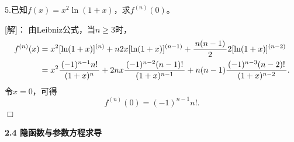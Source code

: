 \bigskip

5.已知$f(x)=x^2\ln(1+x)$，求$f^{(n)}(0)$。

[解]：
由Leibniz公式，当$n\geq3$时，
\begin{align*}
	f^{(n)}(x)&=x^2[\ln(1+x)]^{(n)}+n2x[\ln(1+x)]^{(n-1)}
	+\displaystyle\frac{\,{n(n-1)}\,}{\,{2}\,}2[\ln(1+x)]^{(n-2)}\\
	&=x^2\displaystyle\frac{\,{(-1)^{n-1}n!}\,}{\,{(1+x)^n}\,}+2nx\displaystyle\frac{\,{(-1)^{n-2}(n-1)!}\,}{\,{(1+x)^{n-1}}\,}
	+n(n-1)\displaystyle\frac{\,{(-1)^{n-3}(n-2)!}\,}{\,{(1+x)^{n-2}}\,}.
\end{align*}
令$x=0$，可得
$$f^{(n)}(0)=(-1)^{n-1}n!.$$
\hfill$\Box$

\begin{center}
	\bf 2.4 隐函数与参数方程求导
\end{center}

\bigskip